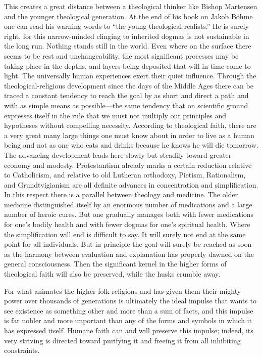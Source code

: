 \documentclass[12pt,a4paper]{article}
\begin{document}
This creates a great distance between a theological thinker like Bishop
Martensen and the younger theological generation. At the end of his book
on Jakob Böhme one can read his warning words to ``the young theological
realists.'' He is surely right, for this narrow-minded clinging to
inherited dogmas is not sustainable in the long run. Nothing stands still
in the world. Even where on the surface there seems to be rest and
unchangeability, the most significant processes may be taking place in the
depths, and layers being deposited that will in time come to light. The
universally human experiences exert their quiet influence. Through the
theological-religious development since the days of the Middle Ages there
can be traced a constant tendency to reach the goal by as short and direct
a path and with as simple means as possible---the same tendency that on
scientific ground expresses itself in the rule that we must not multiply
our principles and hypotheses without compelling necessity. According to
theological faith, there are a very great many large things one must know
about in order to live as a human being and not as one who eats and drinks
because he knows he will die tomorrow. The advancing development leads
here slowly but steadily toward greater economy and modesty.
Protestantism already marks a certain reduction relative to Catholicism,
and relative to old Lutheran orthodoxy, Pietism, Rationalism, and
Grundtvigianism are all definite advances in concentration and
simplification. In this respect there is a parallel between theology and
medicine. The older medicine distinguished itself by an enormous number
of medications and a large number of heroic cures. But one gradually
manages both with fewer medications for one's bodily health and with fewer
dogmas for one's spiritual health. Where the simplification will end is
difficult to say. It will surely not end at the same point for all
individuals. But in principle the goal will surely be reached as soon as
the harmony between evaluation and explanation has properly dawned on the
general consciousness. Then the significant kernel in the higher forms of
theological faith will also be preserved, while the husks crumble away.

For what animates the higher folk religions and has given them their
mighty power over thousands of generations is ultimately the ideal impulse
that wants to see existence as something other and more than a sum of
facts, and this impulse is far nobler and more important than any of the
forms and symbols in which it has expressed itself. Humane faith can and
will preserve this impulse; indeed, its very striving is directed toward
purifying it and freeing it from all inhibiting constraints.
\end{document}
